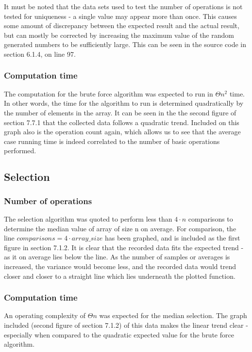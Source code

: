 \documentclass{article}
\begin{document}
            It must be noted that the data sets used to test the number of operations is not tested for uniqueness - a single value may appear more than once. This causes some amount of discrepancy between the expected result and the actual result, but can mostly be corrected by increasing the maximum value of the random generated numbers to be sufficiently large. This can be seen in the source code in section 6.1.4, on line 97.
        \subsubsection{Computation time}
            The computation for the brute force algorithm was expected to run in $\Theta{n^2}$ time. In other words, the time for the algorithm to run is determined quadratically by the number of elements in the array. It can be seen in the the second figure of section 7.7.1 that the collected data follows a quadratic trend. Included on this graph also is the operation count again, which allows us to see that the average case running time is indeed correlated to the number of basic operations performed.

    \subsection{Selection}
        \subsubsection{Number of operations}
            The selection algorithm was quoted to perform less than $4 \cdot n$ comparisons to determine the median value of array of size n on average. For comparison, the line $comparisons = 4 \cdot array\_size$ has been graphed, and is included as the first figure in section 7.1.2. It is clear that the recorded data fits the expected trend - as it on average lies below the line. As the number of samples or averages is increased, the variance would become less, and the recorded data would trend closer and closer to a straight line which lies underneath the plotted function.
        \subsubsection{Computation time}
            An operating complexity of $\Theta{n}$ was expected for the median selection. The graph included (second figure of section 7.1.2) of this data makes the linear trend clear - especially when compared to the quadratic expected value for the brute force algorithm.
\end{document}
